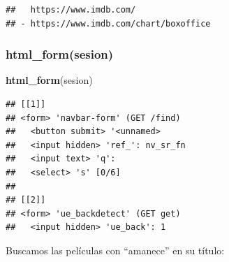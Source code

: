 \documentclass[]{article}
\newenvironment{Shaded}{\begin{snugshade}}{\end{snugshade}}
\newcommand{\KeywordTok}[1]{\textcolor[rgb]{0.13,0.29,0.53}{\textbf{#1}}}
\newcommand{\DataTypeTok}[1]{\textcolor[rgb]{0.13,0.29,0.53}{#1}}
\newcommand{\DecValTok}[1]{\textcolor[rgb]{0.00,0.00,0.81}{#1}}
\newcommand{\StringTok}[1]{\textcolor[rgb]{0.31,0.60,0.02}{#1}}
\newcommand{\OperatorTok}[1]{\textcolor[rgb]{0.81,0.36,0.00}{\textbf{#1}}}
\newcommand{\NormalTok}[1]{#1}
\begin{document}
\begin{Shaded}
\end{Shaded}

\begin{verbatim}
##   https://www.imdb.com/
## - https://www.imdb.com/chart/boxoffice
\end{verbatim}

\subsubsection{html\_form(sesion)}\label{html_formsesion}

\begin{Shaded}
\begin{Highlighting}[]
\KeywordTok{html_form}\NormalTok{(sesion)}
\end{Highlighting}
\end{Shaded}

\begin{verbatim}
## [[1]]
## <form> 'navbar-form' (GET /find)
##   <button submit> '<unnamed>
##   <input hidden> 'ref_': nv_sr_fn
##   <input text> 'q': 
##   <select> 's' [0/6]
## 
## [[2]]
## <form> 'ue_backdetect' (GET get)
##   <input hidden> 'ue_back': 1
\end{verbatim}

Buscamos las películas con ``amanece'' en su título:

\begin{Shaded}
\end{Shaded}
\end{document}
